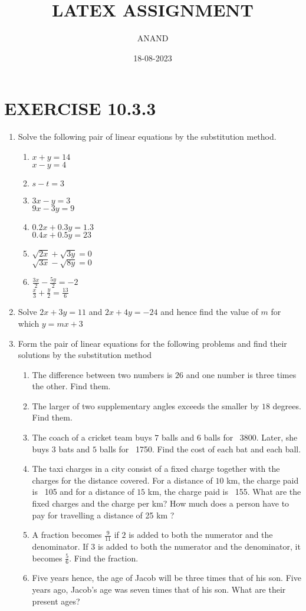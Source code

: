 \documentclass{article}
\theoremstyle{remark}
\begin{document}
\title{LATEX ASSIGNMENT}
\author{ANAND}
\date{18-08-2023}
\maketitle
\section*{EXERCISE 10.3.3}
\begin{enumerate}
\item Solve the following pair of linear equations by the substitution method.
    \begin{enumerate}[label=(\Roman*)]
    \item $x+y=14$ \\
          $x-y=4$
    \item $s-t=3$
    \item $3x-y=3$ \\
          $9x-3y=9$
    \item $0.2x+0.3y=1.3$ \\
          $0.4x+0.5y=23$
    \item $\sqrt{2x}+\sqrt{3y}=0$ \\
          $\sqrt{3x}-\sqrt{8y}=0$
    \item $\frac{3x}{2}-\frac{5y}{2}=-2$ \\
          $\frac{x}{3}+\frac{y}{2}=\frac{13}{6}$
    \end{enumerate}
\item Solve $2x+3y=11$ and $2x+4y=-24$ and hence find the value of $m$ for which $y=mx+3$
\item Form the pair of linear equations for the following problems and find their solutions by the substitution method
    \begin{enumerate}[label=(\Roman*)]
    \item The difference between two numbers is $26$ and one number is three times the other. Find them.
    \item The larger of two supplementary angles exceeds the smaller by $18$ degrees. Find them.
    \item The coach of a cricket team buys $7$ balls and $6$ balls for \rupee~3800. Later, she buys $3$ bats and $5$ balls for \rupee~1750. Find the cost of each bat and each ball.
    \item The taxi charges in a city consist of a fixed charge together with the charges for the distance covered. For a distance of $10$ km, the charge paid is \rupee~105 and for a distance of $15$ km, the charge paid is \rupee~155. What are the fixed charges and the charge per km? How much does a person have to pay for travelling a distance of 25 km ? 
    \item A fraction becomes $\frac{9}{11}$ if $2$ is added to both the numerator and the denominator. If $3$ is added to both the numerator and the denominator, it becomes $\frac{5}{6}$. Find the fraction.
    \item Five years hence, the age of Jacob will be three times that of his son. Five years ago, Jacob's age was seven times that of his son. What are their present ages?
    \end{enumerate}
\end{enumerate}
\end{document}
